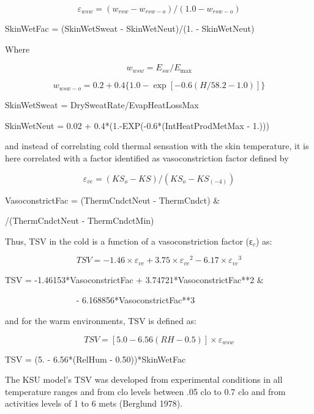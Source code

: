 \begin{equation}
{\varepsilon_{wsw}} = ({w_{rsw}} - {w_{rsw - o}})/(1.0 - {w_{rsw - o}})
\end{equation}

SkinWetFac = (SkinWetSweat - SkinWetNeut)/(1. - SkinWetNeut)

Where

\begin{equation}
{w_{wsw}} = {E_{sw}}/{E_{\max }}
\end{equation}

\begin{equation}
{w_{wsw - o}} = 0.2 + 0.4\{ 1.0 - \exp [ - 0.6(H/58.2 - 1.0)]\}
\end{equation}

SkinWetSweat = DrySweatRate/EvapHeatLossMax

SkinWetNeut = 0.02 + 0.4*(1.-EXP(-0.6*(IntHeatProdMetMax - 1.)))

and instead of correlating cold thermal sensation with the skin temperature, it is here correlated with a factor identified as vasoconstriction factor defined by

\begin{equation}
{\varepsilon_{vc}} = (K{S_o} - KS)/(K{S_o} - K{S_{( - 4)}})
\end{equation}

VasoconstrictFac = (ThermCndctNeut - ThermCndct) \&

/(ThermCndctNeut - ThermCndctMin)

Thus, TSV in the cold is a function of a vasoconstriction factor (ε\(_{c}\)) as:

\begin{equation}
TSV =  - 1.46 \times {\varepsilon_{vc}} + 3.75 \times {\varepsilon_{vc}}^2 - 6.17 \times {\varepsilon_{vc}}^3
\end{equation}

TSV = -1.46153*VasoconstrictFac + 3.74721*VasoconstrictFac**2 \&

~~~~~~~~~~~~~~~~ - 6.168856*VasoconstrictFac**3

and for the warm environments, TSV is defined as:

\begin{equation}
TSV = [5.0 - 6.56(RH - 0.5)] \times {\varepsilon_{wsw}}
\end{equation}

TSV = (5. - 6.56*(RelHum - 0.50))*SkinWetFac

The KSU model's TSV was developed from experimental conditions in all temperature ranges and from clo levels between .05 clo to 0.7 clo and from activities levels of 1 to 6 mets (Berglund 1978).

